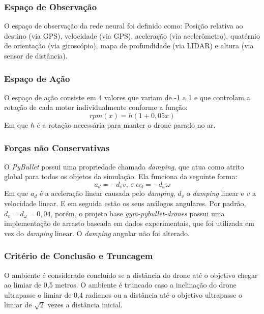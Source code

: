 \documentclass[12pt]{article}
\begin{document}
\subsubsection{Espaço de Observação}
O espaço de observação da rede neural foi definido como: Posição relativa ao destino (via GPS), velocidade (via GPS), aceleração (via acelerômetro), quatérnio de orientação (via giroscópio), mapa de profundidade (via LIDAR) e altura (via sensor de distância).

\subsubsection{Espaço de Ação}
O espaço de ação consiste em 4 valores que variam de -1 a 1 e que controlam a rotação de cada motor individualmente conforme a função:
\[
rpm(x) = h (1 + 0,05x)
\]
Em que $h$ é a rotação necessária para manter o drone parado no ar.

\subsubsection{Forças não Conservativas}
O \textit{PyBullet} possui uma propriedade chamada \textit{damping}, que atua como atrito global para todos os objetos da simulação. Ela funciona da seguinte forma:
\[
a_d = -d_v v
\text{, e }
\alpha_d = -d_\omega \omega
\]
Em que $a_d$ é a aceleração linear causada pelo \textit{damping}, $d_v$ o \textit{damping} linear e $v$ a velocidade linear. E em seguida estão os seus análogos angulares. \newline
Por padrão, $d_v = d_\omega = 0,04$, porém, o projeto base \textit{gym-pybullet-drones} possui uma implementação de arrasto baseada em dados experimentais, que foi utilizada em vez do \textit{damping} linear. O \textit{damping} angular não foi alterado.

\subsubsection{Critério de Conclusão e Truncagem}
O ambiente é considerado concluído se a distância do drone até o objetivo chegar ao limiar de 0,5 metros. \newline
O ambiente é truncado caso a inclinação do drone ultrapasse o limiar de 0,4 radianos ou a distância até o objetivo ultrapasse o limiar de $\sqrt{2}$ vezes a distância inicial.
\end{document}
